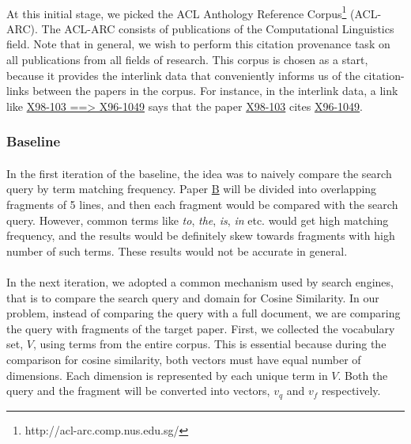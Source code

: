 \documentclass[12 pt]{article}
\begin{document}
\paragraph{}
At this initial stage, we picked the ACL Anthology Reference Corpus\footnote{http://acl-arc.comp.nus.edu.sg/} (ACL-ARC). The ACL-ARC consists of publications of the Computational Linguistics field. Note that in general, we wish to perform this citation provenance task on all publications from all fields of research. This corpus is chosen as a start, because it provides the interlink data that conveniently informs us of the citation-links between the papers in the corpus. For instance, in the interlink data, a link like \url{X98-103 ==> X96-1049} says that the paper \url{X98-103} cites \url{X96-1049}.

\subsubsection{Baseline}
\paragraph{}
In the first iteration of the baseline, the idea was to naively compare the search query by term matching frequency. Paper \url{B} will be divided into overlapping fragments of 5 lines, and then each fragment would be compared with the search query. However, common terms like \textit{to}, \textit{the}, \textit{is}, \textit{in} etc. would get high matching frequency, and the results would be definitely skew towards fragments with high number of such terms. These results would not be accurate in general.

\paragraph{}
In the next iteration, we adopted a common mechanism used by search engines, that is to compare the search query and domain for Cosine Similarity\cite{irtextbook}. In our problem, instead of comparing the query with a full document, we are comparing the query with fragments of the target paper. First, we collected the vocabulary set, $V$, using terms from the entire corpus. This is essential because during the comparison for cosine similarity, both vectors must have equal number of dimensions. Each dimension is represented by each unique term in $V$. Both the query and the fragment will be converted into vectors, $v_q$ and $v_f$ respectively.
\end{document}
